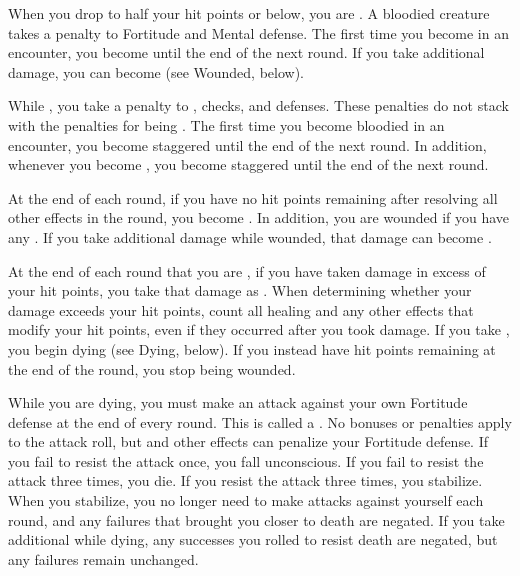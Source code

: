          When you drop to half your hit points or below, you are \bloodied.
        A bloodied creature takes a  penalty to Fortitude and Mental defense.
        The first time you become  in an encounter, you become  until the end of the next round.
        If you take additional damage, you can become  (see Wounded, below).

        \label{Staggered}
        While , you take a  penalty to , checks, and defenses.
        These penalties do not stack with the penalties for being .
        The first time you become bloodied in an encounter, you become staggered until the end of the next round.
        In addition, whenever you become , you become staggered until the end of the next round.

        \label{Wounded} At the end of each round, if you have no hit points remaining after resolving all other effects in the round, you become \wounded.
        In addition, you are wounded if you have any .
        If you take additional damage while wounded, that damage can become .

        At the end of each round that you are , if you have taken damage in excess of your hit points, you take that damage as .
        When determining whether your damage exceeds your hit points, count all healing and any other effects that modify your hit points, even if they occurred after you took damage.
        If you take , you begin dying (see Dying, below).
        If you instead have hit points remaining at the end of the round, you stop being wounded.

        \label{Dying} While you are dying, you must make an attack against your own Fortitude defense at the end of every round.
        This is called a .
        No bonuses or penalties apply to the attack roll, but  and other effects can penalize your Fortitude defense.
        If you fail to resist the attack once, you fall unconscious.
        If you fail to resist the attack three times, you die.
        If you resist the attack three times, you stabilize.
        When you stabilize, you no longer need to make attacks against yourself each round, and any failures that brought you closer to death are negated.
        If you take additional  while dying, any successes you rolled to resist death are negated, but any failures remain unchanged.

